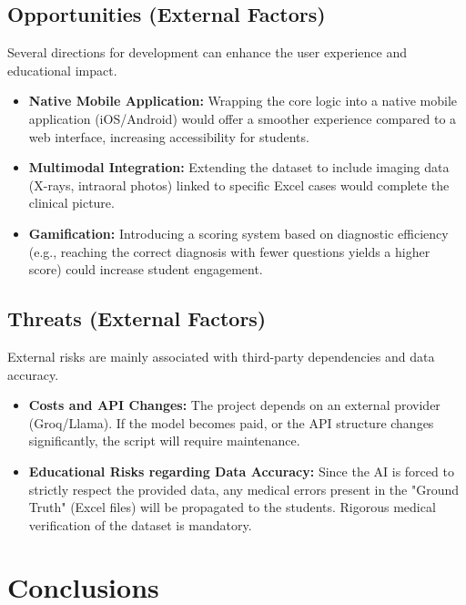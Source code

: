 \documentclass{article}
\begin{document}
\subsection{Opportunities (External Factors)}
Several directions for development can enhance the user experience and educational impact.

\begin{itemize}[itemsep=0.5em]
    \item \textbf{Native Mobile Application:} 
    Wrapping the core logic into a native mobile application (iOS/Android) would offer a smoother experience compared to a web interface, increasing accessibility for students.
    
    \item \textbf{Multimodal Integration:} 
    Extending the dataset to include imaging data (X-rays, intraoral photos) linked to specific Excel cases would complete the clinical picture.
    
    \item \textbf{Gamification:} 
    Introducing a scoring system based on diagnostic efficiency (e.g., reaching the correct diagnosis with fewer questions yields a higher score) could increase student engagement.
\end{itemize}

\subsection{Threats (External Factors)}
External risks are mainly associated with third-party dependencies and data accuracy.

\begin{itemize}[itemsep=0.5em]
    \item \textbf{Costs and API Changes:} 
    The project depends on an external provider (Groq/Llama). If the model becomes paid, or the API structure changes significantly, the script will require maintenance.
    
    \item \textbf{Educational Risks regarding Data Accuracy:} 
    Since the AI is forced to strictly respect the provided data, any medical errors present in the "Ground Truth" (Excel files) will be propagated to the students. Rigorous medical verification of the dataset is mandatory.
\end{itemize}

\section{Conclusions}
\end{document}
